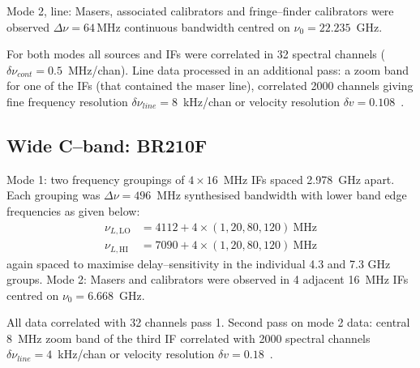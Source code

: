 			Mode 2, line: Masers, associated calibrators and fringe--finder calibrators were observed $\Delta\nu=64$\,MHz continuous bandwidth centred on $\nu_0=22.235$~GHz.
			
			For both modes all sources and IFs were correlated in 32 spectral channels ($\delta\nu_{cont}=0.5$~MHz/chan). Line data processed in an additional pass: a zoom band for one of the IFs (that contained the maser line), correlated 2000 channels giving fine frequency resolution $\delta\nu_{line}=8$~kHz/chan or velocity resolution $\delta v=0.108$~\kms.

		\subsection{Wide C--band: BR210F}
	        Mode 1: two frequency groupings of $4\times16$~MHz IFs spaced 2.978~GHz apart. Each grouping was $\Delta\nu=496$~MHz synthesised bandwidth with lower band edge frequencies as given below:
	        \begin{align*}
	        \nu_{L,\text{LO}} &= 4112 + 4\times(1,20,80,120) ~\text{MHz}\\
	        \nu_{L,\text{HI}} &= 7090 + 4\times(1,20,80,120) ~\text{MHz}
	        \end{align*} again spaced to maximise delay--sensitivity in the individual 4.3 and 7.3 GHz groups. Mode 2: Masers and calibrators were observed in 4 adjacent 16~MHz IFs centred on $\nu_0 = 6.668$~GHz.
	        
	        All data correlated with 32 channels pass 1. Second pass on mode 2 data: central 8~MHz zoom band of the third IF correlated with 2000 spectral channels $\delta\nu_{line}=4$~kHz/chan or velocity resolution $\delta v=0.18$~\kms.
        

